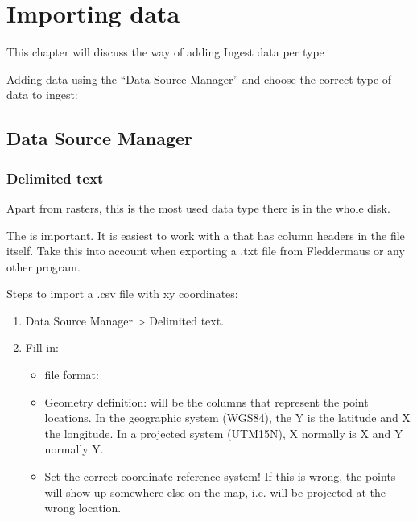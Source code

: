 \documentclass[letterpaper,10pt,english]{sphinxmanual}
\begin{document}
\chapter{Importing data}
\label{\detokenize{03_data_ingest:importing-data}}\label{\detokenize{03_data_ingest::doc}}
\sphinxAtStartPar
This chapter will discuss the way of adding Ingest data per type

\sphinxAtStartPar
Adding data using the “Data Source Manager” and choose the correct type of data to ingest:


\section{Data Source Manager}
\label{\detokenize{03_data_ingest:data-source-manager}}

\subsection{Delimited text}
\label{\detokenize{03_data_ingest:delimited-text}}
\sphinxAtStartPar
Apart from rasters, this is the most used data type there is in the whole disk.

\sphinxAtStartPar
The   is important. It is easiest to work with a  that has column headers in the file itself. Take this into account when exporting a .txt file from Fleddermaus or any other program.

\sphinxAtStartPar
Steps to import a .csv file with xy coordinates:
\begin{enumerate}
%
\item {} 
\sphinxAtStartPar
Data Source Manager \sphinxhyphen{}\textgreater{} Delimited text.

\item {} 
\sphinxAtStartPar
Fill in:
\begin{itemize}
\item {} 
\sphinxAtStartPar
file format:

\item {} 
\sphinxAtStartPar
Geometry definition: will be the columns that represent the point locations. In the geographic system (WGS84), the Y is the latitude and X the longitude. In a projected system (UTM15N), X normally is X and Y normally Y.

\item {} 
\sphinxAtStartPar
Set the correct coordinate reference system! If this is wrong, the points will show up somewhere else on the map, i.e. will be projected at the wrong location.

\end{itemize}

\end{enumerate}
\end{document}
